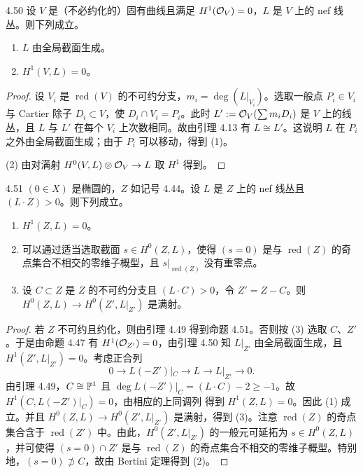 \begin{lemmap}{4.50}
设 $V$ 是（不必约化的）固有曲线且满足 $H^1(\mathcal{O}_V)=0$，$L$ 是 $V$ 上的 nef 线丛。则下列成立。
\begin{enumerate}[label=(\arabic*),leftmargin=2.4em,itemsep=1pt,topsep=2pt]
\item $L$ 由全局截面生成。
\item $H^1(V,L)=0$。
\end{enumerate}
\end{lemmap}

\begin{proof}
设 $V_i$ 是 $\operatorname{red}(V)$ 的不可约分支，$m_i=\deg(L|_{V_i})$。选取一般点 $P_i\in V_i$ 与 Cartier 除子 $D_i\subset V$，使 $D_i\cap V_i=P_i$。此时 $L':=\mathcal{O}_V(\sum m_iD_i)$ 是 $V$ 上的线丛，且 $L$ 与 $L'$ 在每个 $V_i$ 上次数相同。故由引理 4.13 有 $L\cong L'$。这说明 $L$ 在 $P_i$ 之外由全局截面生成；由于 $P_i$ 可以移动，得到 (1)。

(2) 由对满射 $H^0(V,L)\otimes\mathcal{O}_V\to L$ 取 $H^1$ 得到。
\end{proof}

\begin{propositionp}{4.51}
$(0\in X)$ 是椭圆的，$Z$ 如记号 4.44。设 $L$ 是 $Z$ 上的 nef 线丛且 $(L\cdot Z)>0$。则下列成立。
\begin{enumerate}[label=(\arabic*),leftmargin=2.4em,itemsep=1pt,topsep=2pt]
\item $H^1(Z,L)=0$。
\item 可以通过适当选取截面 $s\in H^0(Z,L)$，使得 $(s=0)$ 是与 $\operatorname{red}(Z)$ 的奇点集合不相交的零维子概型，且 $s|_{\operatorname{red}(Z)}$ 没有重零点。
\item 设 $C\subset Z$ 是 $Z$ 的不可约分支且 $(L\cdot C)>0$，令 $Z'=Z-C$。则 $H^0(Z,L)\to H^0(Z',L|_{Z'})$ 是满射。
\end{enumerate}
\end{propositionp}

\begin{proof}
若 $Z$ 不可约且约化，则由引理 4.49 得到命题 4.51。否则按 (3) 选取 $C$、$Z'$。于是由命题 4.47 有 $H^1(\mathcal{O}_{Z'})=0$，由引理 4.50 知 $L|_{Z'}$ 由全局截面生成，且 $H^1(Z',L|_{Z'})=0$。考虑正合列
\[ 0\to L(-Z')|_C\to L\to L|_{Z'}\to 0. \]
由引理 4.49，$C\cong\mathbb{P}^1$ 且 $\deg L(-Z')|_C=(L\cdot C)-2\ge -1$。故 $H^1(C,L(-Z')|_C)=0$，由相应的上同调列
得到 $H^1(Z,L)=0$。因此 (1) 成立。并且 $H^0(Z,L)\to H^0(Z',L|_{Z'})$ 是满射，得到 (3)。注意 $\operatorname{red}(Z)$ 的奇点集合含于 $\operatorname{red}(Z')$ 中。由此，$H^0(Z',L|_{Z'})$ 的一般元可延拓为 $s\in H^0(Z,L)$，并可使得 $(s=0)\cap Z'$ 是与 $\operatorname{red}(Z)$ 的奇点集合不相交的零维子概型。特别地，$(s=0)\not\supset C$，故由 Bertini 定理得到 (2)。
\end{proof}

